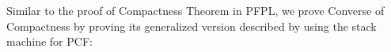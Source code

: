 \documentclass{article}
\newcommand{\RNum}[1]{\uppercase\expandafter{\romannumeral #1\relax}}
\begin{document}





Similar to the proof of Compactness Theorem in PFPL,
we prove Converse of Compactness by proving
its generalized version described by using the stack machine for PCF:
\end{document}
